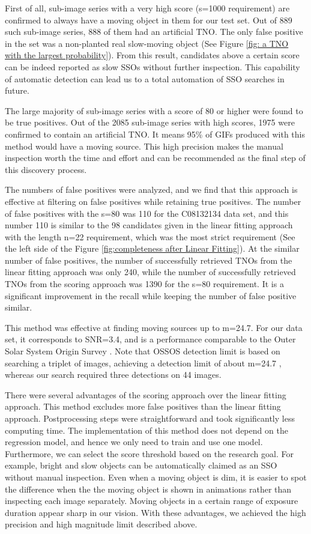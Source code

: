 \documentclass{aastex631}
\begin{document}
First of all, sub-image series with a very high score (s=1000 requirement) are confirmed to always have a moving object in them for our test set.
Out of 889 such sub-image series, 888 of them had an artificial TNO.
The only false positive in the set was a non-planted real slow-moving object (See Figure \ref{fig: a TNO with the largest probability}). 
From this result, candidates above a certain score can be indeed reported as slow SSOs without further inspection.
This capability of automatic detection can lead us to a total automation of SSO searches in future.

The large majority of sub-image series with a score of 80 or higher were found to be true positives.
Out of the 2085 sub-image series with high scores, 1975 were confirmed to contain an artificial TNO.
It means 95\% of GIFs produced with this method would have a moving source.
This high precision makes the manual inspection worth the time and effort and can be recommended as the final step of this discovery process.

The numbers of false positives were analyzed, and we find that this approach is effective at filtering on false positives while retaining true positives.
The number of false positives with the s=80 was 110 for the C08132134 data set, and this number 110 is similar to the 98 candidates given in the linear fitting approach with the length n=22 requirement, which was the most strict requirement (See the left side of the Figure \ref{fig:completeness after Linear Fitting}).
At the similar number of false positives, the number of successfully retrieved TNOs from the linear fitting approach was only 240, while the number of successfully retrieved TNOs from the scoring approach was 1390 for the s=80 requirement.
It is a significant improvement in the recall while keeping the number of false positive similar.

This method was effective at finding moving sources up to m=24.7.
For our data set, it corresponds to SNR=3.4, and is a performance comparable to the Outer Solar System Origin Survey \citep{2016AJ....152...70B}.
Note that OSSOS detection limit is based on searching a triplet of images, achieving a detection limit of about m=24.7 \citep{2018ApJS..236...18B}, whereas our search required three detections on 44 images.

There were several advantages of the scoring approach over the linear fitting approach.
This method excludes more false positives than the linear fitting approach.
Postprocessing steps were straightforward and took significantly less computing time.
The implementation of this method does not depend on the regression model, and hence we only need to train and use one model.
Furthermore, we can select the score threshold based on the research goal.
For example, bright and slow objects can be automatically claimed as an SSO without manual inspection.
Even when a moving object is dim, it is easier to spot the difference when the the moving object is shown in animations rather than inspecting each image separately.
Moving objects in a certain range of exposure duration appear sharp in our vision. \citep{1997Burr}
With these advantages, we achieved the high precision and high magnitude limit described above.
\end{document}
